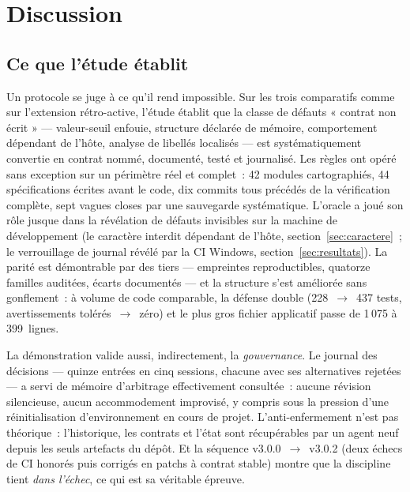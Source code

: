\section{Discussion}\label{sec:discussion}

\subsection{Ce que l’étude établit}

Un protocole se juge à ce qu’il rend impossible. Sur les trois comparatifs
comme sur l’extension rétro-active, l’étude établit que la classe de
défauts « contrat non écrit » — valeur-seuil enfouie, structure déclarée de
mémoire, comportement dépendant de l’hôte, analyse de libellés localisés —
est systématiquement convertie en contrat nommé, documenté, testé et
journalisé. Les règles ont opéré sans exception sur un périmètre réel et
complet~: 42 modules cartographiés, 44 spécifications écrites avant le
code, dix commits tous précédés de la vérification complète, sept vagues
closes par une sauvegarde systématique. L’oracle a joué son rôle jusque
dans la révélation de défauts invisibles sur la machine de développement
(le caractère interdit dépendant de l’hôte,
section~\ref{sec:caractere}~; le verrouillage de journal révélé par la CI
Windows, section~\ref{sec:resultats}). La parité est démontrable par des
tiers — empreintes reproductibles, quatorze familles auditées, écarts
documentés — et la structure s’est améliorée sans gonflement~: à volume de
code comparable, la défense double (228~$\to$~437 tests, avertissements
tolérés~$\to$~zéro) et le plus gros fichier applicatif passe de 1\,075 à
399~lignes.

La démonstration valide aussi, indirectement, la \emph{gouvernance}. Le
journal des décisions — quinze entrées en cinq sessions, chacune avec ses
alternatives rejetées — a servi de mémoire d’arbitrage effectivement
consultée~: aucune révision silencieuse, aucun accommodement improvisé, y
compris sous la pression d’une réinitialisation d’environnement en cours
de projet. L’anti-enfermement n’est pas théorique~: l’historique, les
contrats et l’état sont récupérables par un agent neuf depuis les seuls
artefacts du dépôt. Et la séquence v3.0.0~$\to$~v3.0.2 (deux échecs de CI
honorés puis corrigés en patchs à contrat stable) montre que la
discipline tient \emph{dans l’échec}, ce qui est sa véritable épreuve.

